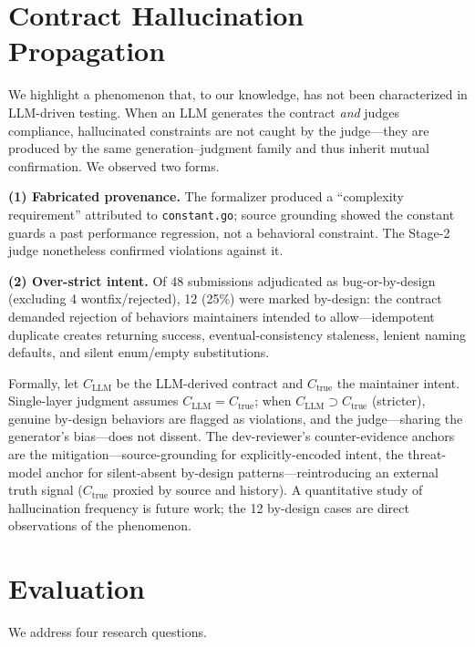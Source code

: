 \documentclass[sigconf, anonymous, review]{acmart}
\begin{document}
\section{Contract Hallucination Propagation}\label{sec:hallucination}
We highlight a phenomenon that, to our knowledge, has not been characterized in LLM-driven testing. When an LLM generates the contract \emph{and} judges compliance, hallucinated constraints are not caught by the judge---they are produced by the same generation--judgment family and thus inherit mutual confirmation. We observed two forms.

\textbf{(1) Fabricated provenance.} The formalizer produced a ``complexity requirement'' attributed to \texttt{constant.go}; source grounding showed the constant guards a past performance regression, not a behavioral constraint. The Stage-2 judge nonetheless confirmed violations against it.

\textbf{(2) Over-strict intent.} Of 48 submissions adjudicated as bug-or-by-design (excluding 4 wontfix/rejected), 12 (25\%) were marked by-design: the contract demanded rejection of behaviors maintainers intended to allow---idempotent duplicate creates returning success, eventual-consistency staleness, lenient naming defaults, and silent enum/empty substitutions.

Formally, let $C_{\mathrm{LLM}}$ be the LLM-derived contract and $C_{\mathrm{true}}$ the maintainer intent. Single-layer judgment assumes $C_{\mathrm{LLM}} = C_{\mathrm{true}}$; when $C_{\mathrm{LLM}} \supset C_{\mathrm{true}}$ (stricter), genuine by-design behaviors are flagged as violations, and the judge---sharing the generator's bias---does not dissent. The dev-reviewer's counter-evidence anchors are the mitigation---source-grounding for explicitly-encoded intent, the threat-model anchor for silent-absent by-design patterns---reintroducing an external truth signal ($C_{\mathrm{true}}$ proxied by source and history). A quantitative study of hallucination frequency is future work; the 12 by-design cases are direct observations of the phenomenon.

\section{Evaluation}\label{sec:eval}

We address four research questions.
\end{document}
